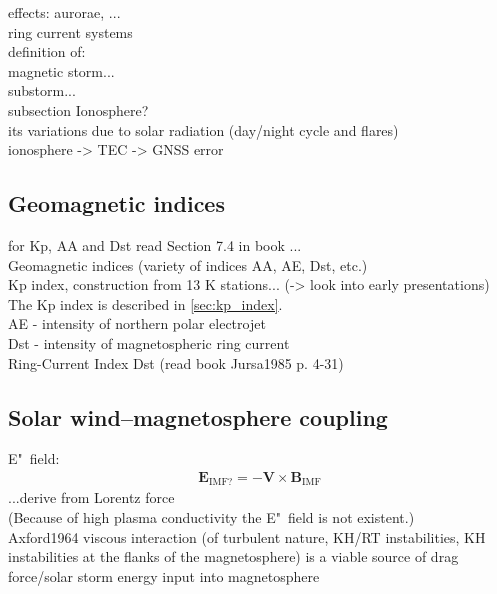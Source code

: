 effects: aurorae, ...\\

ring current systems\\

definition of:\\
magnetic storm...\\
substorm...\\

subsection Ionosphere?\\
its variations due to solar radiation (day/night cycle and flares)\\
ionosphere -> TEC -> GNSS error\\


\subsection{Geomagnetic indices}
\label{sec:geomagnetic_indices}

for Kp, AA and Dst read Section 7.4 in book \citet{Bothmer2007}...\\
Geomagnetic indices (variety of indices AA, AE, Dst, etc.)\\
Kp index, construction from 13 K stations... (-> look into early presentations)\\	%
The Kp index is described in \autoref{sec:kp_index}.\\

AE - intensity of northern polar electrojet\\
Dst - intensity of magnetospheric ring current\\
Ring-Current Index Dst (read book Jursa1985 p. 4-31)\\


\subsection{Solar wind--magnetosphere coupling}
\label{sec:solar_wind_magnetosphere_coupling}

E"~field:	%
\begin{align}
	\textbf{E}_\text{IMF?} = -\textbf{V} \times \textbf{B}_\text{IMF}
\end{align}
...derive from Lorentz force\\
(Because of high plasma conductivity the E"~field is not existent.)\\

Axford1964 viscous interaction (of turbulent nature, KH/RT instabilities, KH instabilities at the flanks of the magnetosphere) is a viable source of drag force/solar storm energy input into magnetosphere\\


